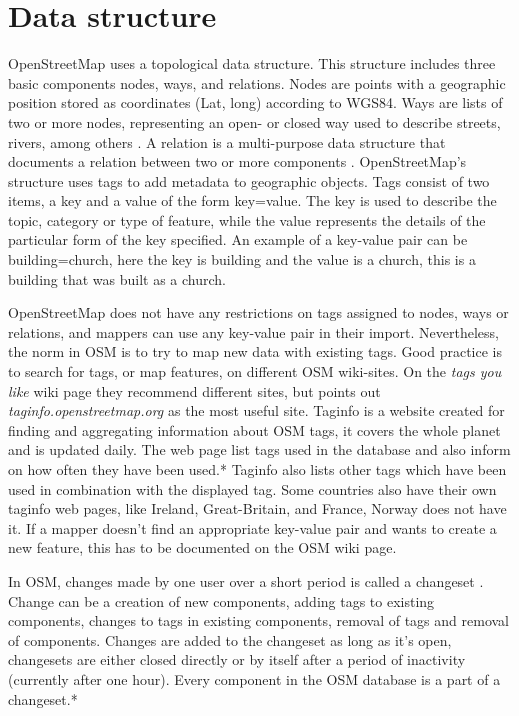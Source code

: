 \section{Data structure}
OpenStreetMap uses a topological data structure. This structure includes three basic components nodes, ways, and relations. Nodes are points with a geographic position stored as coordinates (Lat, long) according to WGS84. Ways are lists of two or more nodes, representing an open- or closed way used to describe streets, rivers, among others \cite{Debruyne2015}. A relation is a multi-purpose data structure that documents a relation between two or more components \cite{OpenStreetMapg}. OpenStreetMap's structure uses tags to add metadata to geographic objects. Tags consist of two items, a key and a value of the form key=value. The key is used to describe the topic, category or type of feature, while the value represents the details of the particular form of the key specified. An example of a key-value pair can be building=church, here the key is building and the value is a church, this is a building that was built as a church. 

OpenStreetMap does not have any restrictions on tags assigned to nodes, ways or relations, and mappers can use any key-value pair in their import. Nevertheless, the norm in OSM is to try to map new data with existing tags. Good practice is to search for tags, or map features, on different OSM wiki-sites. On the \textit{tags you like} wiki page they recommend different sites, but points out \textit{taginfo.openstreetmap.org} as the most useful site. Taginfo is a website created for finding and aggregating information about OSM tags, it covers the whole planet and is updated daily. The web page list tags used in the database and also inform on how often they have been used.* %
 Taginfo also lists other tags which have been used in combination with the displayed tag. Some countries also have their own taginfo web pages, like Ireland, Great-Britain, and France, Norway does not have it. If a mapper doesn't find an appropriate key-value pair and wants to create a new feature, this has to be documented on the OSM wiki page. 

In OSM, changes made by one user over a short period is called a changeset \cite{OpenStreetMapi}.  Change can be a creation of new components, adding tags to existing components, changes to tags in existing components, removal of tags and removal of components. Changes are added to the changeset as long as it's open, changesets are either closed directly or by itself after a period of inactivity (currently after one hour). Every component in the OSM database is a part of a changeset.* %

